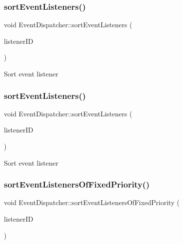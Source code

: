 \subsubsection{\texorpdfstring{sort\+Event\+Listeners()}{sortEventListeners()}\hspace{0.1cm}{\footnotesize\ttfamily [1/2]}}
{\footnotesize\ttfamily void Event\+Dispatcher\+::sort\+Event\+Listeners (\begin{DoxyParamCaption}\item[{const Event\+Listener\+::\+Listener\+ID \&}]{listener\+ID }\end{DoxyParamCaption})\hspace{0.3cm}{\ttfamily [protected]}}

Sort event listener \mbox{\label{classEventDispatcher_ab194c90a0a72abc2e53f922abc1fa7e4}} 
\subsubsection{\texorpdfstring{sort\+Event\+Listeners()}{sortEventListeners()}\hspace{0.1cm}{\footnotesize\ttfamily [2/2]}}
{\footnotesize\ttfamily void Event\+Dispatcher\+::sort\+Event\+Listeners (\begin{DoxyParamCaption}\item[{const Event\+Listener\+::\+Listener\+ID \&}]{listener\+ID }\end{DoxyParamCaption})\hspace{0.3cm}{\ttfamily [protected]}}

Sort event listener \mbox{\label{classEventDispatcher_a83e6fcd45dbc28743b3dc015a3061ef2}} 
\subsubsection{\texorpdfstring{sort\+Event\+Listeners\+Of\+Fixed\+Priority()}{sortEventListenersOfFixedPriority()}\hspace{0.1cm}{\footnotesize\ttfamily [1/2]}}
{\footnotesize\ttfamily void Event\+Dispatcher\+::sort\+Event\+Listeners\+Of\+Fixed\+Priority (\begin{DoxyParamCaption}\item[{const Event\+Listener\+::\+Listener\+ID \&}]{listener\+ID }\end{DoxyParamCaption})\hspace{0.3cm}{\ttfamily [protected]}}

